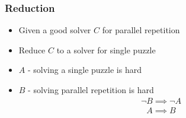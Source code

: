 \documentclass[first,firstsupp, last]{ETHclass}
\begin{document}
\begin{frame}[t]
\frametitle{Reduction}
\begin{itemize}
  \pause
  \item Given a good solver $C$ for parallel repetition
  \pause
  \item Reduce $C$ to a solver for single puzzle
  \pause
  \item $A$ - solving a single puzzle is hard
  \item $B$ - solving parallel repetition is hard
      \begin{align*}
        \lnot B \implies \lnot A
      \end{align*}
    \begin{align*}
      A \implies B
    \end{align*}
\end{itemize}
\end{frame}

\end{document}
